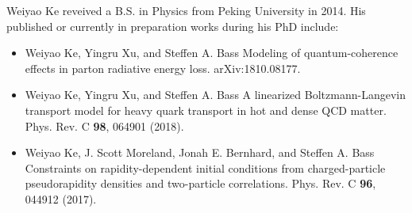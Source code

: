 \documentclass[PhD]{dukethesis2006}
\begin{document}
\doublespacing









\nocite{*}
\singlespacing

\begingroup
    \setlength{\bibsep}{10pt}
    
\endgroup


\biography
\doublespacing
Weiyao Ke reveived a B.S. in Physics from Peking University in 2014. His published or currently in preparation works during his PhD include:

\begin{itemize}
\singlespacing
\item Weiyao Ke, Yingru Xu, and Steffen A. Bass Modeling of quantum-coherence effects in parton radiative energy loss. arXiv:1810.08177.
\item Weiyao Ke, Yingru Xu, and Steffen A. Bass A linearized Boltzmann-Langevin transport model for heavy quark transport in hot and dense QCD matter. Phys. Rev. C {\bf 98}, 064901 (2018).
\item Weiyao Ke, J. Scott Moreland, Jonah E. Bernhard, and Steffen A. Bass Constraints on rapidity-dependent initial conditions from charged-particle pseudorapidity densities and two-particle correlations. Phys. Rev. C {\bf 96}, 044912 (2017).
\end{itemize}
\end{document}
